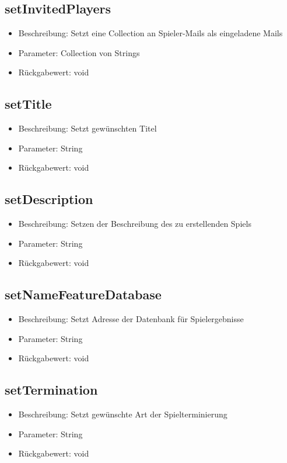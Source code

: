 \documentclass[a4paper]{scrreprt}
\begin{document}
    \subsection{setInvitedPlayers}
    \begin{itemize}
        \item Beschreibung: Setzt eine Collection an Spieler-Mails als eingeladene Mails
        \item Parameter: Collection von Strings
        \item Rückgabewert: void
    \end{itemize}
    \subsection{setTitle}
    \begin{itemize}
        \item Beschreibung: Setzt gewünschten Titel
        \item Parameter: String
        \item Rückgabewert: void
    \end{itemize}
    \subsection{setDescription}
    \begin{itemize}
        \item Beschreibung: Setzen der Beschreibung des zu erstellenden Spiels
        \item Parameter: String
        \item Rückgabewert: void
    \end{itemize}
    \subsection{setNameFeatureDatabase}
    \begin{itemize}
        \item Beschreibung: Setzt Adresse der Datenbank für Spielergebnisse
        \item Parameter: String
        \item Rückgabewert: void
    \end{itemize}
    \subsection{setTermination}
    \begin{itemize}
        \item Beschreibung: Setzt gewünschte Art der Spielterminierung
        \item Parameter: String
        \item Rückgabewert: void
    \end{itemize}
\end{document}
